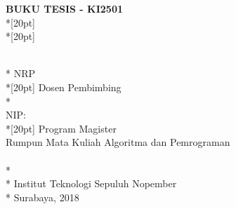 \newpage

  \sffamily
  \thispagestyle{empty}
  \begin{spacing}{2.0}
    {\noindent
      \textbf{BUKU TESIS - KI2501}\\*[20pt]
      {\large\textbf{\MakeUppercase{\judul}}} \\*[20pt]
    }
  \end{spacing}
  \begin{spacing}{1.3}
  {\large \noindent
    \MakeUppercase{\penulis} \\*
    NRP \nrplama \\*[20pt]
    Dosen Pembimbing\\*
    \pembimbingsatu \\
    NIP: \nikpembimbingsatu \\*[20pt]
    Program Magister\\
    Rumpun Mata Kuliah Algoritma dan Pemrograman\\
    \MakeUppercase{\jurusanbaru} \\*
    \fakultasbaru \\*
    Institut Teknologi Sepuluh Nopember \\*
    Surabaya, 2018
  }
  \end{spacing}
  \rmfamily
  \normalsize
  \restoregeometry
  \cleardoublepage

